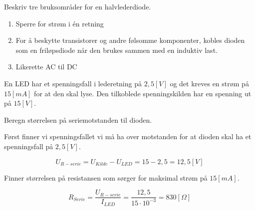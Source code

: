 \vspace{0.5cm} %

\begin{question}[name=Oppgave, topic=dioder]
	Beskriv tre bruksområder for en halvlederdiode.
\end{question}

\vspace{0.5cm} %

\begin{solution}[name=Løsningsforslag oppgave]
	\begin{enumerate}[label=\roman*)]
		\item Sperre for strøm i én retning
		\item For å beskytte transistorer og andre følsomme komponenter, kobles dioden som en friløpsdiode når den brukes sammen med en induktiv last.
		\item Likerette AC til DC
	\end{enumerate}
\end{solution}

\vspace{0.5cm} %





\begin{question}[name=Oppgave, topic=LEDdioder]
	En LED har et spenningsfall i lederetning på $2,5 [V]$ og det kreves en strøm på $15 [mA]$ for at den skal lyse. Den tilkoblede spenningskilden har en spenning ut på $15 [V]$.
	
	Beregn størrelsen på seriemotstanden til dioden.
\end{question}

\vspace{0.5cm} %

\begin{solution}[name=Løsningsforslag oppgave]
Først finner vi spenningsfallet vi må ha over motstanden for at dioden skal ha et spenningsfall på $2,5 [V]$.


\[U_{R-serie}=U_{Kilde}-U_{LED}=15-2,5=12,5 [V]\]

Finner størrelsen på resistansen som sørger for maksimal strøm på $15 [mA]$.

\[R_{Serie}=\frac{U_{R-serie}}{I_{LED}}=\frac{12,5}{15\cdot10^{-3}}=830 [\Omega]\]

\end{solution}


